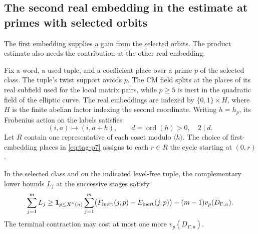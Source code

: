 \subsection{The second real embedding in the estimate at primes with selected orbits}
\label{subsec:second-period}

The first embedding supplies a gain from the selected orbits. The product estimate also needs the contribution at the other real embedding.

Fix a word, a used tuple, and a coefficient place over a prime
\(p\) of the selected class. The tuple's twist support avoids \(p\).
The CM field splits at the places of its real subfield used for the
local matrix pairs, while \(p\ge5\) is inert in the quadratic
field of the elliptic curve. The real embeddings are indexed by \(\{0,1\}\times H\), where \(H\) is the finite abelian factor indexing the second coordinate. Writing \(h=h_p\), its Frobenius action on the labels satisfies
\[
       (i,a)\longmapsto(i,a+h),\qquad d=\operatorname{ord}(h)>0,\quad 2\mid d .
\] Let \(R\)
contain one representative of each coset modulo \(\langle h\rangle\).
The choice of first-embedding places in \eqref{eq:tag-p7} assigns to each
\(r\in R\) the cycle starting at \((0,r)\).

\begin{proposition}\label{prop:complementary-period-price}
In the selected class and on the indicated level-free tuple,
the complementary lower bounds \(L_j\) at the successive stages satisfy
\[
 \sum_{j=1}^m L_j\ge
 {\bf1}_{p\le X''(n)}\sum_{j=1}^m
   \bigl(F_{\rm inert}(j,p)-E_{\rm inert}(j,p)\bigr)
  -(m-1)v_p(D_{\Gamma,u}).
\]
The terminal contraction may cost at most one more
\(v_p(D_{\Gamma,u})\).
\end{proposition}

